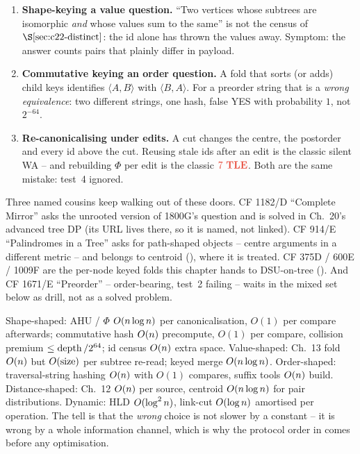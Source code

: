 \begin{warningbox}
\begin{enumerate}[nosep,leftmargin=1.6em]
  \item \textbf{Shape-keying a value question.} ``Two vertices whose subtrees are
        isomorphic \emph{and} whose values sum to the same'' is not the census of
        \(\secref{c22-distinct}\): the id alone has thrown the values away.
        Symptom: the answer counts pairs that plainly differ in payload.
  \item \textbf{Commutative keying an order question.} A fold that sorts (or adds)
        child keys identifies \(\langle A,B\rangle\) with \(\langle B,A\rangle\).
        For a preorder string that is a \emph{wrong equivalence}: two different
        strings, one hash, false YES with probability \(1\), not \(2^{-64}\).
  \item \textbf{Re-canonicalising under edits.} A cut changes the centre, the
        postorder and every id above the cut.  Reusing stale ids after an edit is
        the classic silent WA -- and rebuilding \(\Phi\) per edit is the classic
        \(\tle\).  Both are the same mistake: test~4 ignored.
\end{enumerate}
\end{warningbox}

\begin{notebox}
Three named cousins keep walking out of these doors.  CF 1182/D ``Complete
Mirror'' asks the unrooted version of 1800G's question and is solved in
Ch.~20's advanced tree DP (its URL lives there, so it is named, not linked).
CF 914/E ``Palindromes in a Tree'' asks for path-shaped objects -- centre
arguments in a different metric -- and belongs to centroid (), where
it is treated.  CF 375D / 600E / 1009F are the per-node keyed folds this chapter
hands to DSU-on-tree ().  And CF 1671/E ``Preorder'' -- order-bearing,
test~2 failing -- waits in the mixed set below as drill, not as a solved problem.
\end{notebox}

\begin{complexitybox}
Shape-shaped: AHU / \(\Phi\) \(O(n\log n)\) per canonicalisation, \(O(1)\)
per compare afterwards; commutative hash \(O(n)\) precompute, \(O(1)\) per
compare, collision premium \(\le \operatorname{depth}/2^{64}\); id census \(O(n)\) extra
space.  Value-shaped: Ch.~13 fold \(O(n)\) but \(O(\operatorname{size})\) per subtree
re-read; keyed merge \(O(n\log n)\).  Order-shaped: traversal-string hashing
\(O(n)\) with \(O(1)\) compares, suffix tools \(O(n)\) build.
Distance-shaped: Ch.~12 \(O(n)\) per source, centroid \(O(n\log n)\) for
pair distributions.  Dynamic: HLD \(O(\log^2 n)\), link-cut \(O(\log n)\)
amortised per operation.  The tell is that the \emph{wrong} choice is not slower
by a constant -- it is wrong by a whole information channel, which is why the
protocol order in  comes before any optimisation.
\end{complexitybox}

